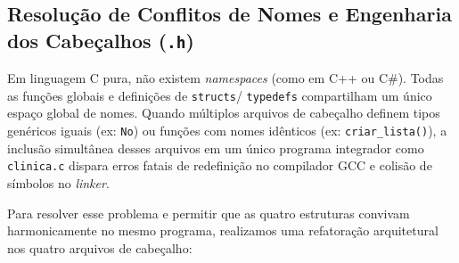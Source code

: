 \documentclass[11pt,a4paper]{article}
\begin{document}
\newpage

\subsection{Resolução de Conflitos de Nomes e Engenharia dos Cabeçalhos (\texttt{.h})}

Em linguagem C pura, não existem \textit{namespaces} (como em C++ ou C\#). Todas as funções globais e definições de \texttt{structs}/ \texttt{typedefs} compartilham um único espaço global de nomes. Quando múltiplos arquivos de cabeçalho definem tipos genéricos iguais (ex: \texttt{No}) ou funções com nomes idênticos (ex: \texttt{criar\_lista()}), a inclusão simultânea desses arquivos em um único programa integrador como \texttt{clinica.c} dispara erros fatais de redefinição no compilador GCC e colisão de símbolos no \textit{linker}.

Para resolver esse problema e permitir que as quatro estruturas convivam harmonicamente no mesmo programa, realizamos uma refatoração arquitetural nos quatro arquivos de cabeçalho:
\end{document}
